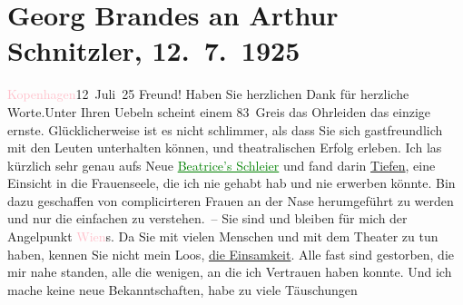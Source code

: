 

               \section[Georg Brandes an Arthur Schnitzler, 12. 7. 1925]{ Georg Brandes an Arthur Schnitzler, 12. 7. 1925}\nopagebreak{}\rehead{ }\normalsize\beginnumbering{} \toendnotes[C]{\smallbreak\pagebreak[2]} 
\toendnotes[C]{\smallbreak}\pstart
           \raggedleft{}{\pb}\textcolor{pink}{Kopenhagen}{}\ledrightnote{\textcolor{pink}{Kopenhagen}}{ }12 Juli 25\pend
           \pstart
           Freund! Haben Sie herzlichen Dank für herzliche Worte.\hspace*{2em}Unter Ihren Uebeln scheint einem 83 Greis das Ohrleiden
               das einzige ernste. Glücklicherweise ist es nicht schlimmer, als dass Sie sich
               gastfreundlich mit den Leuten unterhalten können, und theatralischen Erfolg erleben.
               Ich las kürzlich sehr genau aufs Neue \textcolor{green}{\uline{Beatrice’s Schleier}}{}\ledrightnote{\textcolor{green}{Der Schleier der Beatrice. Schauspiel in fünf Akten}} und fand darin \uline{Tiefen}, eine Einsicht in die
               Frauenseele, die ich nie gehabt hab und nie erwerben könnte. Bin dazu geschaffen von
               complicirteren Frauen an der Nase herumgeführt zu werden und nur die einfachen zu
               verstehen. – Sie sind und bleiben für mich der Angelpunkt \textcolor{pink}{Wien}{}\ledrightnote{\textcolor{pink}{Wien}}s. Da Sie mit vielen Menschen und mit dem Theater zu tun haben, kennen
               Sie nicht mein Loos, \uline{die Einsamkeit}. Alle fast sind
               gestorben, die mir nahe standen, alle {\pb}die wenigen, an die ich Vertrauen
               haben konnte. Und ich mache keine neue Bekanntschaften, habe zu viele Täuschungen

